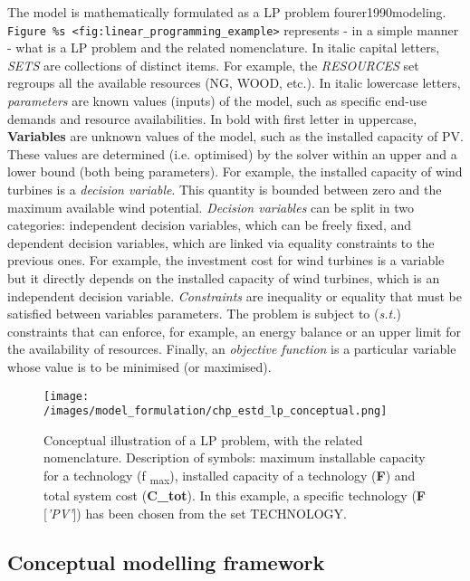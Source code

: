 \documentclass[
]{article}
\begin{document}
The model is mathematically formulated as a LP problem
fourer1990modeling.
\texttt{Figure\ \%s\ \textless{}fig:linear\_programming\_example\textgreater{}}
represents - in a simple manner - what is a LP problem and the related
nomenclature. In italic capital letters, \emph{SETS} are collections of
distinct items. For example, the \emph{RESOURCES} set regroups all the
available resources (NG, WOOD, etc.). In italic lowercase letters,
\emph{parameters} are known values (inputs) of the model, such as
specific end-use demands and resource availabilities. In bold with first
letter in uppercase, \textbf{Variables} are unknown values of the model,
such as the installed capacity of PV. These values are determined (i.e.
optimised) by the solver within an upper and a lower bound (both being
parameters). For example, the installed capacity of wind turbines is a
\emph{decision variable}. This quantity is bounded between zero and the
maximum available wind potential. \emph{Decision variables} can be split
in two categories: independent decision variables, which can be freely
fixed, and dependent decision variables, which are linked via equality
constraints to the previous ones. For example, the investment cost for
wind turbines is a variable but it directly depends on the installed
capacity of wind turbines, which is an independent decision variable.
\emph{Constraints} are inequality or equality that must be satisfied
between variables parameters. The problem is subject to (\emph{s.t.})
constraints that can enforce, for example, an energy balance or an upper
limit for the availability of resources. Finally, an \emph{objective
function} is a particular variable whose value is to be minimised (or
maximised).

\begin{figure}
\centering
\texttt{[image: /images/model\_formulation/chp\_estd\_lp\_conceptual.png]}
\caption{Conceptual illustration of a LP problem, with the related
nomenclature. Description of symbols: maximum installable capacity for a
technology (f \textsubscript{max}), installed capacity of a technology
(\textbf{F}) and total system cost (\textbf{C\_tot}). In this example, a
specific technology (\textbf{F} {[}\emph{'PV'}{]}) has been chosen from
the set TECHNOLOGY.}
\end{figure}

\subsection{Conceptual modelling
framework}\label{app:sec:conceptual_modelling_framework}
\end{document}
